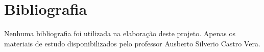 \chapter*{Bibliografia}

    Nenhuma bibliografia foi utilizada na elaboração deste projeto. Apenas os materiais de estudo disponibilizados pelo professor Ausberto Silverio Castro Vera.
    
